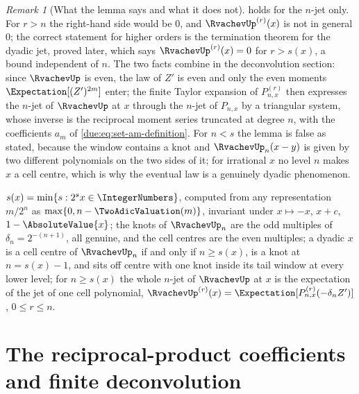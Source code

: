 \documentclass[11pt,oneside]{article}
\theoremstyle{plain}
\theoremstyle{definition}
\theoremstyle{remark}
\newtheorem{remark}[theorem]{Remark}
\newcommand{\upn}[1]{\RvachevUp_{#1}}
\newcommand{\dep}[1]{s\!\left(#1\right)}                    %
\newcommand{\am}[1]{a_{#1}}                                 %
\begin{document}
\begin{remark}[What the lemma says and what it does not]
\label{due:rmk:set-tail-scope}
 holds for the $n$-jet only.  For $r>n$ the
right-hand side would be $0$, and $\RvachevUp^{(r)}(x)$ is not in general
$0$; the correct statement for higher orders is the termination theorem
for the dyadic jet, proved later, which says $\RvachevUp^{(r)}(x)=0$ for
$r>\dep{x}$, a bound independent of $n$.  The two facts combine in the
deconvolution section: since $\RvachevUp$ is even, the law of $Z'$ is even
and only the even moments $\Expectation[(Z')^{2m}]$ enter; the finite
Taylor expansion of $P_{n,x}^{(r)}$ then expresses the $n$-jet of
$\RvachevUp$ at $x$ through the $n$-jet of $P_{n,x}$ by a triangular
system, whose inverse is the reciprocal moment series truncated at degree
$n$, with the coefficients $\am{m}$ of \cref{due:eq:set-am-definition}.
For $n<s$ the lemma is false as stated, because the window contains a
knot and $\upn{n}(x-y)$ is given by two different polynomials on the two
sides of it; for irrational $x$ no level $n$ makes $x$ a cell centre,
which is why the eventual law is a genuinely dyadic phenomenon.
\end{remark}

\begin{summarybox}[title={Depth and cells, in four lines}]
$\dep{x}=\min\{s:2^{s}x\in\IntegerNumbers\}$, computed from any
representation $m/2^{n}$ as $\max\{0,n-\TwoAdicValuation(m)\}$, invariant
under $x\mapsto-x$, $x+c$, $1-\AbsoluteValue{x}$; the knots of $\upn{n}$
are the odd multiples of $\delta_n=2^{-(n+1)}$, all genuine, and the cell
centres are the even multiples; a dyadic $x$ is a cell centre of $\upn{n}$
if and only if $n\ge\dep{x}$, is a knot at $n=\dep{x}-1$, and sits off
centre with one knot inside its tail window at every lower level; for
$n\ge\dep{x}$ the whole $n$-jet of $\RvachevUp$ at $x$ is the expectation
of the jet of one cell polynomial, $\RvachevUp^{(r)}(x)
=\Expectation[P_{n,x}^{(r)}(-\delta_nZ')]$, $0\le r\le n$.
\end{summarybox}


\section{The reciprocal-product coefficients and finite deconvolution}
\label{due:sec:coefficients}
\end{document}

